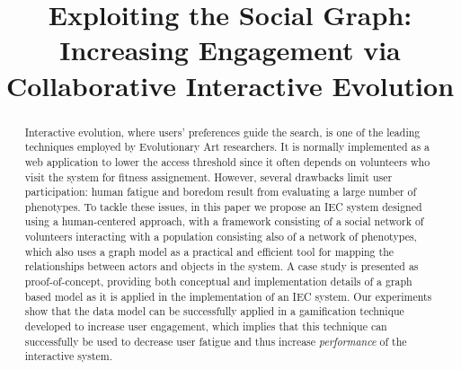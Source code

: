 \documentclass[conference]{IEEEtran}
\begin{document}

\title{Exploiting the Social Graph: Increasing Engagement via
  Collaborative Interactive Evolution}

\author{
\and
{}
\and
{}
}

\maketitle


\begin{abstract}
Interactive evolution, where users' preferences guide the search, is
one of the leading techniques employed by Evolutionary Art
researchers. It is normally implemented as a web application to lower
the access threshold since it often depends on volunteers who visit
the system for fitness assignement. However,  several drawbacks limit
user participation: human fatigue and boredom result from evaluating 
a large number of phenotypes. To tackle these issues, in this paper we
propose an IEC system designed using a human-centered approach, with a
framework consisting of a social network of  
volunteers interacting with a population consisting also of a network 
of phenotypes, which also uses a graph model as a practical 
and efficient tool for mapping the relationships between actors and
objects in the system. A case study is presented as proof-of-concept, 
providing both conceptual and implementation details of a graph based model 
as it is  applied in the implementation of an IEC system. Our
experiments show that the data model can be successfully applied in a
gamification technique developed to increase user engagement, which
implies that this technique can successfully be used to 
decrease user fatigue and thus increase {\em performance} of the
interactive system.
\end{abstract}

\IEEEpeerreviewmaketitle
\end{document}

